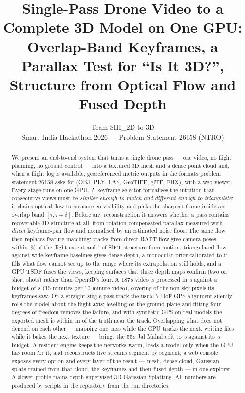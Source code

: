 \documentclass[10pt,a4paper,twocolumn]{article}
\title{\textbf{Single-Pass Drone Video to a Complete 3D Model on One GPU:\\Overlap-Band Keyframes, a Parallax Test for ``Is It 3D?'',\\Structure from Optical Flow and Fused Depth}}
\author{Team SIH\_2D-to-3D\\\small Smart India Hackathon 2026 --- Problem Statement 26158 (NTRO)}
\date{}
\begin{document}
\maketitle

\begin{abstract}
We present an end-to-end system that turns a single drone pass --- one video, no flight planning, no ground control --- into a textured 3D mesh and a dense point cloud and, when a flight log is available, georeferenced metric outputs in the formats problem statement 26158 asks for (OBJ, PLY, LAS, GeoTIFF, glTF, FBX), with a web viewer. Every stage runs on one GPU. A keyframe selector formalises the intuition that consecutive views must be \emph{similar enough to match and different enough to triangulate}: it chains optical flow to measure co-visibility and picks the sharpest frame inside an overlap band $[\tau,\tau+\delta]$. Before any reconstruction it answers whether a pass contains recoverable 3D structure at all, from rotation-compensated parallax measured with \emph{direct} keyframe-pair flow and normalised by an estimated noise floor. The same flow then replaces feature matching: tracks from direct RAFT flow give camera poses within \FlowSfmCentre\,\% of the flight extent and \FlowSfmRot$^\circ$ of SIFT structure from motion, triangulated flow against wide keyframe baselines gives dense depth, a monocular prior calibrated to it fills what flow cannot see up to the range where its extrapolation still holds, and a GPU TSDF fuses the views, keeping surfaces that three depth maps confirm (two on short shots) rather than Open3D's four. A 187\,s video is processed in \FastQutubSeconds\,s against a budget of \FastQutubBudget\,s (15 minutes per 10-minute video), covering \FastQutubCompl{} of the non-sky pixels its keyframes saw. On a straight single-pass track the usual 7-DoF GPS alignment silently rolls the model about the flight axis; levelling on the ground plane and fitting four degrees of freedom removes the failure, and with synthetic GPS on real models the exported mesh is within \GeoNearTrack\,m of the truth near the track. Overlapping what does not depend on each other --- mapping one pass while the GPU tracks the next, writing files while it bakes the next texture --- brings the 55\,s Jal Mahal edit to \SpeedAfter\,s against its \SpeedBudget\,s budget. A resident engine keeps the networks warm, loads a model only when the GPU has room for it, and reconstructs live streams segment by segment; a web console exposes every option and every layer of the result --- mesh, dense cloud, Gaussian splats trained from that cloud, the keyframes and their fused depth --- in one explorer. A slower profile trains depth-supervised 3D Gaussian Splatting. All numbers are produced by scripts in the repository from the run directories.
\end{abstract}
\end{document}
